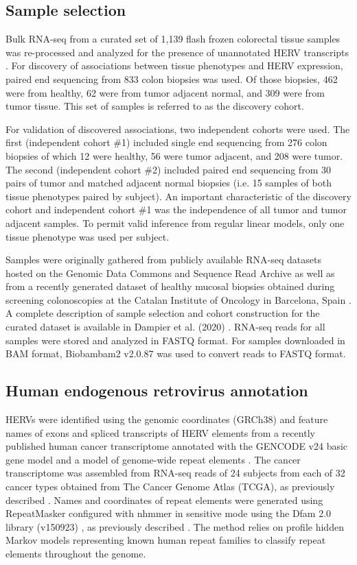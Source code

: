 \subsection*{Sample selection}
Bulk RNA-seq from a curated set of 1,139 flash frozen colorectal tissue samples was re-processed and analyzed for the presence of unannotated HERV transcripts \citep{Dampier2020}.
For discovery of associations between tissue phenotypes and HERV expression, paired end sequencing from 833 colon biopsies was used.
Of those biopsies, 462 were from healthy, 62 were from tumor adjacent normal, and 309 were from tumor tissue.
This set of samples is referred to as the discovery cohort.

For validation of discovered associations, two independent cohorts were used.
The first (independent cohort \#1) included single end sequencing from 276 colon biopsies of which 12 were healthy, 56 were tumor adjacent, and 208 were tumor.
The second (independent cohort \#2) included paired end sequencing from 30 pairs of tumor and matched adjacent normal biopsies (i.e. 15 samples of both tissue phenotypes paired by subject).
An important characteristic of the discovery cohort and independent cohort \#1 was the independence of all tumor and tumor adjacent samples.
To permit valid inference from regular linear models, only one tissue phenotype was used per subject.

Samples were originally gathered from publicly available RNA-seq datasets hosted on the Genomic Data Commons and Sequence Read Archive as well as from a recently generated dataset of healthy mucosal biopsies obtained during screening colonoscopies at the Catalan Institute of Oncology in Barcelona, Spain \citep{Dampier2020, DiezObrero2020}.
A complete description of sample selection and cohort construction for the curated dataset is available in Dampier et al. (2020) \citep{Dampier2020}.
RNA-seq reads for all samples were stored and analyzed in FASTQ format.
For samples downloaded in BAM format, Biobambam2 v2.0.87 \citep{Tischler2014} was used to convert reads to FASTQ format.

\subsection*{Human endogenous retrovirus annotation}
HERVs were identified using the genomic coordinates (GRCh38) and feature names of exons and spliced transcripts of HERV elements from a recently published human cancer transcriptome annotated with the GENCODE v24 basic gene model \citep{Frankish2018} and a model of genome-wide repeat elements \citep{Attig2019}.
The cancer transcriptome was assembled from RNA-seq reads of 24 subjects from each of 32 cancer types obtained from The Cancer Genome Atlas (TCGA), as previously described \citep{Attig2019}.
Names and coordinates of repeat elements were generated using RepeatMasker \citep{Smit2015} configured with nhmmer \citep{Wheeler2013} in sensitive mode using the Dfam 2.0 library (v150923) \citep{Hubley2015}, as previously described \citep{Attig2017}.
The method relies on profile hidden Markov models representing known human repeat families to classify repeat elements throughout the genome.

